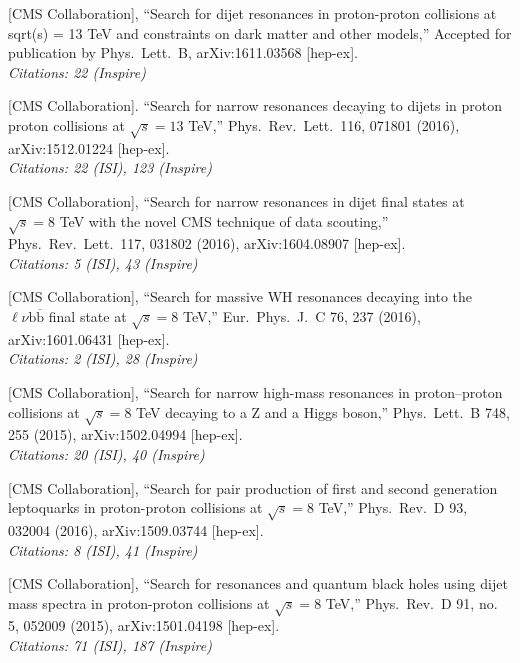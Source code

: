 \documentclass[10pt, a4paper]{article}
\begin{document}
\begin{thebibliography}{599}

  [CMS Collaboration],
  ``Search for dijet resonances in proton-proton collisions at sqrt(s) = 13 TeV and constraints on dark matter and other models,''
  Accepted for publication by Phys.\ Lett.\ B, arXiv:1611.03568
  [hep-ex]. \\
\emph{Citations: 22 (Inspire)}

  [CMS Collaboration].
  ``Search for narrow resonances decaying to 
  dijets in proton proton
  collisions at $\sqrt{s}=13$ TeV,''
  Phys.\ Rev.\ Lett.\  116, 071801 (2016), arXiv:1512.01224 [hep-ex]. \\
\emph{Citations: 22 (ISI), 123
  (Inspire)}

[CMS Collaboration],
  ``Search for narrow resonances in dijet final states at $\sqrt{s}=8$
  TeV with the novel CMS technique of data scouting,''
  Phys.\ Rev.\ Lett.\  117, 031802 (2016), arXiv:1604.08907 [hep-ex]. \\
\emph{Citations: 5 (ISI), 43 (Inspire)}

[CMS Collaboration],
  ``Search for massive WH resonances decaying into the $\ell \nu \mathrm{b} \overline{\mathrm{b}} $ final state at $\sqrt{s}=8$ TeV,''
  Eur.\ Phys.\ J.\ C 76, 237 (2016), arXiv:1601.06431 [hep-ex]. \\
\emph{Citations: 2 (ISI), 28 (Inspire)}

 [CMS Collaboration],
  ``Search for narrow high-mass resonances in proton–proton collisions
  at $\sqrt{s}=8$ TeV decaying to a Z and a Higgs boson,''
  Phys.\ Lett.\ B 748, 255 (2015), arXiv:1502.04994 [hep-ex].\\
\emph{Citations: 20 (ISI), 40 (Inspire)}

[CMS Collaboration],
  ``Search for pair production of first and second generation
  leptoquarks in proton-proton collisions at $\sqrt{s}=8$ TeV,''
  Phys.\ Rev.\ D  93, 032004 (2016), arXiv:1509.03744 [hep-ex].\\
\emph{Citations: 8 (ISI), 41 (Inspire)}

  [CMS Collaboration],
  ``Search for resonances and quantum black holes using dijet mass
  spectra in proton-proton collisions at $\sqrt{s}=8$ TeV,''
  Phys.\ Rev.\ D 91, no. 5, 052009 (2015), arXiv:1501.04198 [hep-ex].\\
\emph{Citations: 71 (ISI), 187 (Inspire)}


\end{thebibliography}
\end{document}
